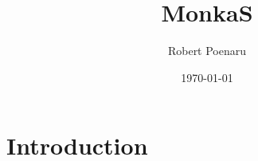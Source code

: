 \documentclass{beamer}
\title{MonkaS}
\author{Robert Poenaru}
\date{\today}
\begin{document}
\maketitle

\section{Introduction}
\end{document}
